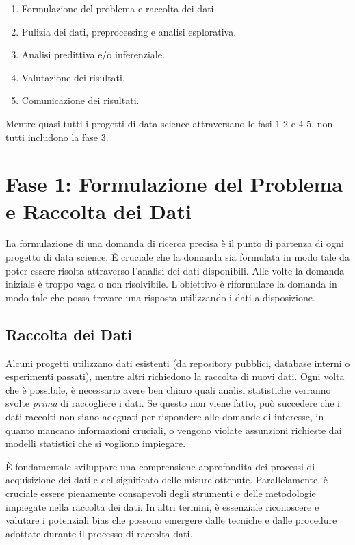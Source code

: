 \documentclass[
  letterpaper,
  DIV=11,
  numbers=noendperiod]{scrreprt}
\providecommand{\tightlist}{%
  \setlength{\itemsep}{0pt}\setlength{\parskip}{0pt}}\usepackage{longtable,booktabs,array}
\theoremstyle{definition}
\theoremstyle{remark}
\begin{document}
\begin{enumerate}
\def\labelenumi{\arabic{enumi}.}
\tightlist
\item
  Formulazione del problema e raccolta dei dati.
\item
  Pulizia dei dati, preprocessing e analisi esplorativa.
\item
  Analisi predittiva e/o inferenziale.
\item
  Valutazione dei risultati.
\item
  Comunicazione dei risultati.
\end{enumerate}

Mentre quasi tutti i progetti di data science attraversano le fasi 1-2 e
4-5, non tutti includono la fase 3.

\section{Fase 1: Formulazione del Problema e Raccolta dei
Dati}\label{fase-1-formulazione-del-problema-e-raccolta-dei-dati}

La formulazione di una domanda di ricerca precisa è il punto di partenza
di ogni progetto di data science. È cruciale che la domanda sia
formulata in modo tale da poter essere risolta attraverso l'analisi dei
dati disponibili. Alle volte la domanda iniziale è troppo vaga o non
risolvibile. L'obiettivo è riformulare la domanda in modo tale che possa
trovare una risposta utilizzando i dati a disposizione.

\subsection{Raccolta dei Dati}\label{raccolta-dei-dati}

Alcuni progetti utilizzano dati esistenti (da repository pubblici,
database interni o esperimenti passati), mentre altri richiedono la
raccolta di nuovi dati. Ogni volta che è possibile, è necessario avere
ben chiaro quali analisi statistiche verranno svolte \emph{prima} di
raccogliere i dati. Se questo non viene fatto, può succedere che i dati
raccolti non siano adeguati per rispondere alle domande di interesse, in
quanto mancano informazioni cruciali, o vengono violate assunzioni
richieste dai modelli statistici che si vogliono impiegare.

È fondamentale sviluppare una comprensione approfondita dei processi di
acquisizione dei dati e del significato delle misure ottenute.
Parallelamente, è cruciale essere pienamente consapevoli degli strumenti
e delle metodologie impiegate nella raccolta dei dati. In altri termini,
è essenziale riconoscere e valutare i potenziali bias che possono
emergere dalle tecniche e dalle procedure adottate durante il processo
di raccolta dati.
\end{document}

